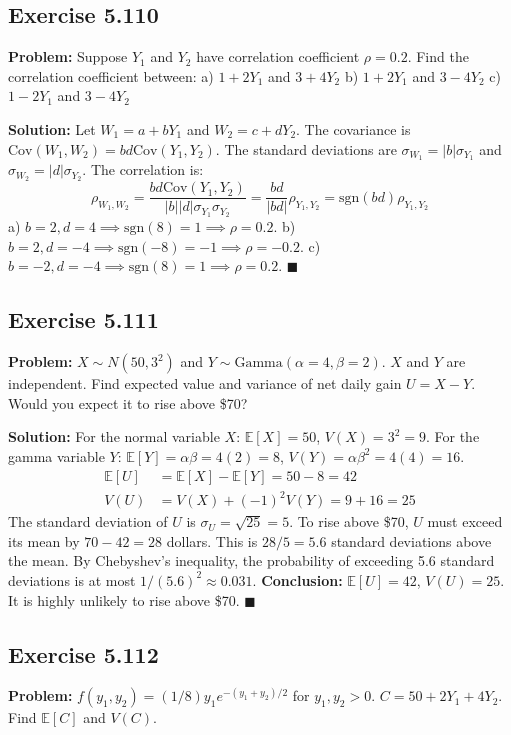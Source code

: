 \documentclass[11pt, a4paper]{article}
\theoremstyle{definition}
\theoremstyle{remark}
\newcommand{\E}{\mathbb{E}}
\begin{document}
\subsection{Exercise 5.110}
\textbf{Problem:} Suppose $Y_1$ and $Y_2$ have correlation coefficient $\rho = 0.2$. Find the correlation coefficient between:
a) $1 + 2Y_1$ and $3 + 4Y_2$
b) $1 + 2Y_1$ and $3 - 4Y_2$
c) $1 - 2Y_1$ and $3 - 4Y_2$

\textbf{Solution:}
Let $W_1 = a + bY_1$ and $W_2 = c + dY_2$. The covariance is $\text{Cov}(W_1, W_2) = bd\text{Cov}(Y_1, Y_2)$. The standard deviations are $\sigma_{W_1} = |b|\sigma_{Y_1}$ and $\sigma_{W_2} = |d|\sigma_{Y_2}$.
The correlation is:
\[ \rho_{W_1, W_2} = \frac{bd\text{Cov}(Y_1, Y_2)}{|b||d|\sigma_{Y_1}\sigma_{Y_2}} = \frac{bd}{|bd|} \rho_{Y_1, Y_2} = \text{sgn}(bd) \rho_{Y_1, Y_2} \]
a) $b=2, d=4 \implies \text{sgn}(8) = 1 \implies \rho = 0.2$.
b) $b=2, d=-4 \implies \text{sgn}(-8) = -1 \implies \rho = -0.2$.
c) $b=-2, d=-4 \implies \text{sgn}(8) = 1 \implies \rho = 0.2$. $\blacksquare$

\subsection{Exercise 5.111}
\textbf{Problem:} $X \sim N(50, 3^2)$ and $Y \sim \text{Gamma}(\alpha=4, \beta=2)$. $X$ and $Y$ are independent. Find expected value and variance of net daily gain $U = X - Y$. Would you expect it to rise above \$70?

\textbf{Solution:}
For the normal variable $X$: $\E[X] = 50$, $V(X) = 3^2 = 9$.
For the gamma variable $Y$: $\E[Y] = \alpha\beta = 4(2) = 8$, $V(Y) = \alpha\beta^2 = 4(4) = 16$.
\begin{align*}
\E[U] &= \E[X] - \E[Y] = 50 - 8 = 42 \\
V(U) &= V(X) + (-1)^2 V(Y) = 9 + 16 = 25
\end{align*}
The standard deviation of $U$ is $\sigma_U = \sqrt{25} = 5$.
To rise above \$70, $U$ must exceed its mean by $70 - 42 = 28$ dollars.
This is $28 / 5 = 5.6$ standard deviations above the mean. By Chebyshev's inequality, the probability of exceeding 5.6 standard deviations is at most $1 / (5.6)^2 \approx 0.031$.
\textbf{Conclusion:} $\E[U] = 42$, $V(U) = 25$. It is highly unlikely to rise above \$70. $\blacksquare$

\subsection{Exercise 5.112}
\textbf{Problem:} $f(y_1, y_2) = (1/8)y_1 e^{-(y_1+y_2)/2}$ for $y_1, y_2 > 0$. $C = 50 + 2Y_1 + 4Y_2$. Find $\E[C]$ and $V(C)$.
\end{document}

